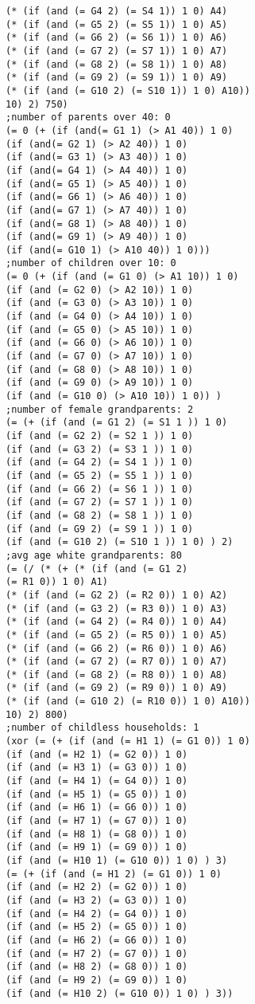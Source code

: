 \documentclass[runningheads]{llncs}
\begin{document}
\begin{verbatim}
(* (if (and (= G4 2) (= S4 1)) 1 0) A4)
(* (if (and (= G5 2) (= S5 1)) 1 0) A5)
(* (if (and (= G6 2) (= S6 1)) 1 0) A6)
(* (if (and (= G7 2) (= S7 1)) 1 0) A7)
(* (if (and (= G8 2) (= S8 1)) 1 0) A8)
(* (if (and (= G9 2) (= S9 1)) 1 0) A9)
(* (if (and (= G10 2) (= S10 1)) 1 0) A10))
10) 2) 750)
;number of parents over 40: 0
(= 0 (+ (if (and(= G1 1) (> A1 40)) 1 0)
(if (and(= G2 1) (> A2 40)) 1 0)
(if (and(= G3 1) (> A3 40)) 1 0)
(if (and(= G4 1) (> A4 40)) 1 0)
(if (and(= G5 1) (> A5 40)) 1 0)
(if (and(= G6 1) (> A6 40)) 1 0)
(if (and(= G7 1) (> A7 40)) 1 0)
(if (and(= G8 1) (> A8 40)) 1 0)
(if (and(= G9 1) (> A9 40)) 1 0)
(if (and(= G10 1) (> A10 40)) 1 0)))
;number of children over 10: 0
(= 0 (+ (if (and (= G1 0) (> A1 10)) 1 0)
(if (and (= G2 0) (> A2 10)) 1 0)
(if (and (= G3 0) (> A3 10)) 1 0)
(if (and (= G4 0) (> A4 10)) 1 0)
(if (and (= G5 0) (> A5 10)) 1 0)
(if (and (= G6 0) (> A6 10)) 1 0)
(if (and (= G7 0) (> A7 10)) 1 0)
(if (and (= G8 0) (> A8 10)) 1 0)
(if (and (= G9 0) (> A9 10)) 1 0)
(if (and (= G10 0) (> A10 10)) 1 0)) )
;number of female grandparents: 2
(= (+ (if (and (= G1 2) (= S1 1 )) 1 0)
(if (and (= G2 2) (= S2 1 )) 1 0)
(if (and (= G3 2) (= S3 1 )) 1 0)
(if (and (= G4 2) (= S4 1 )) 1 0)
(if (and (= G5 2) (= S5 1 )) 1 0)
(if (and (= G6 2) (= S6 1 )) 1 0)
(if (and (= G7 2) (= S7 1 )) 1 0)
(if (and (= G8 2) (= S8 1 )) 1 0)
(if (and (= G9 2) (= S9 1 )) 1 0)
(if (and (= G10 2) (= S10 1 )) 1 0) ) 2)
;avg age white grandparents: 80
(= (/ (* (+ (* (if (and (= G1 2)
(= R1 0)) 1 0) A1)
(* (if (and (= G2 2) (= R2 0)) 1 0) A2)
(* (if (and (= G3 2) (= R3 0)) 1 0) A3)
(* (if (and (= G4 2) (= R4 0)) 1 0) A4)
(* (if (and (= G5 2) (= R5 0)) 1 0) A5)
(* (if (and (= G6 2) (= R6 0)) 1 0) A6)
(* (if (and (= G7 2) (= R7 0)) 1 0) A7)
(* (if (and (= G8 2) (= R8 0)) 1 0) A8)
(* (if (and (= G9 2) (= R9 0)) 1 0) A9)
(* (if (and (= G10 2) (= R10 0)) 1 0) A10))
10) 2) 800)
;number of childless households: 1
(xor (= (+ (if (and (= H1 1) (= G1 0)) 1 0)
(if (and (= H2 1) (= G2 0)) 1 0)
(if (and (= H3 1) (= G3 0)) 1 0)
(if (and (= H4 1) (= G4 0)) 1 0)
(if (and (= H5 1) (= G5 0)) 1 0)
(if (and (= H6 1) (= G6 0)) 1 0)
(if (and (= H7 1) (= G7 0)) 1 0)
(if (and (= H8 1) (= G8 0)) 1 0)
(if (and (= H9 1) (= G9 0)) 1 0)
(if (and (= H10 1) (= G10 0)) 1 0) ) 3)
(= (+ (if (and (= H1 2) (= G1 0)) 1 0)
(if (and (= H2 2) (= G2 0)) 1 0)
(if (and (= H3 2) (= G3 0)) 1 0)
(if (and (= H4 2) (= G4 0)) 1 0)
(if (and (= H5 2) (= G5 0)) 1 0)
(if (and (= H6 2) (= G6 0)) 1 0)
(if (and (= H7 2) (= G7 0)) 1 0)
(if (and (= H8 2) (= G8 0)) 1 0)
(if (and (= H9 2) (= G9 0)) 1 0)
(if (and (= H10 2) (= G10 0)) 1 0) ) 3))

\end{verbatim}
\end{document}
